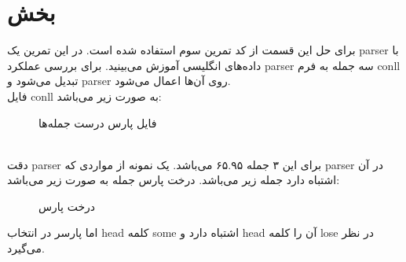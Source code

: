 \documentclass[a4paper]{article}
\begin{document}
\section{بخش }
برای حل این قسمت از کد تمرین سوم استفاده شده است. در این تمرین یک parser با داده‌های انگلیسی آموزش می‌بینید. برای بررسی عملکرد parser سه جمله به فرم conll تبدیل می‌شود و parser روی آن‌ها اعمال می‌شود.
\\
فایل conll به صورت زیر می‌باشد:
\begin{figure}[h!]
\caption{فایل پارس درست جمله‌ها}
\label{f1}
\end{figure}
\vspace{10mm}
\newline
\\ دقت parser برای این ۳ جمله ۶۵.۹۵ می‌باشد. 
\newline
یک نمونه از مواردی که parser در آن اشتباه دارد جمله زیر می‌باشد. درخت پارس جمله به صورت زیر می‌باشد:
\newline
\begin{figure}[h!]
\caption{درخت پارس}
\label{f1}
\end{figure}
\vspace{10mm}
\newline
اما پارسر در انتخاب head کلمه some اشتباه دارد و head‌ آن را کلمه lose در نظر می‌گیرد.
\end{document}
